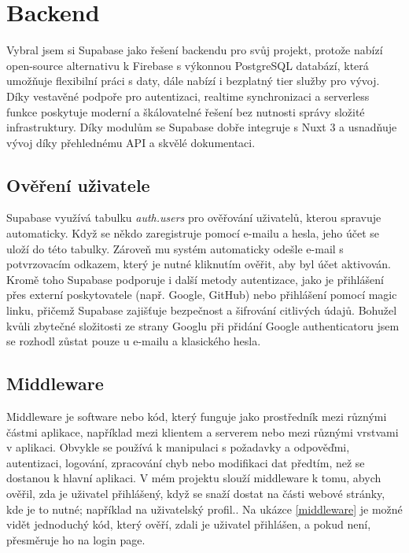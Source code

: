 \section{Backend}
Vybral jsem si Supabase jako řešení backendu pro svůj projekt, protože nabízí open-source alternativu k Firebase s výkonnou PostgreSQL databází, která umožňuje flexibilní práci s daty, dále nabízí i bezplatný tier služby pro vývoj. Díky vestavěné podpoře pro autentizaci, realtime synchronizaci a serverless funkce poskytuje moderní a škálovatelné řešení bez nutnosti správy složité infrastruktury. Díky modulům se Supabase dobře integruje s Nuxt 3 a usnadňuje vývoj díky přehlednému API a skvělé dokumentaci.\cite{NuxtSupabase, supabasedocs}
\subsection{Ověření uživatele}
Supabase využívá tabulku \textit{auth.users} pro ověřování uživatelů, kterou spravuje automaticky. Když se někdo zaregistruje pomocí e-mailu a hesla, jeho účet se uloží do této tabulky. Zároveň mu systém automaticky odešle e-mail s potvrzovacím odkazem, který je nutné kliknutím ověřit, aby byl účet aktivován.\cite{supabseAuth, JohnKomarnicki}
\newline
Kromě toho Supabase podporuje i další metody autentizace, jako je přihlášení přes externí poskytovatele (např. Google, GitHub) nebo přihlášení pomocí magic linku, přičemž Supabase zajišťuje bezpečnost a šifrování citlivých údajů.\cite{supabseAuth} Bohužel kvůli zbytečné složitosti ze strany Googlu při přidání Google authenticatoru jsem se rozhodl zůstat pouze u e-mailu a klasického hesla.
\subsection{Middleware}
Middleware je software nebo kód, který funguje jako prostředník mezi různými částmi aplikace, například mezi klientem a serverem nebo mezi různými vrstvami v aplikaci. Obvykle se používá k manipulaci s požadavky a odpověďmi, autentizaci, logování, zpracování chyb nebo modifikaci dat předtím, než se dostanou k hlavní aplikaci. \cite{geeksforgeeks-2024}
\newline
V mém projektu slouží middleware k tomu, abych ověřil, zda je uživatel přihlášený, když se snaží dostat na části webové stránky, kde je to nutné; například na uživatelský profil.\cite{LearnVue}. Na ukázce \ref{middleware} je možné vidět jednoduchý kód, který ověří, zdali je uživatel přihlášen, a pokud není, přesměruje ho na login page.

